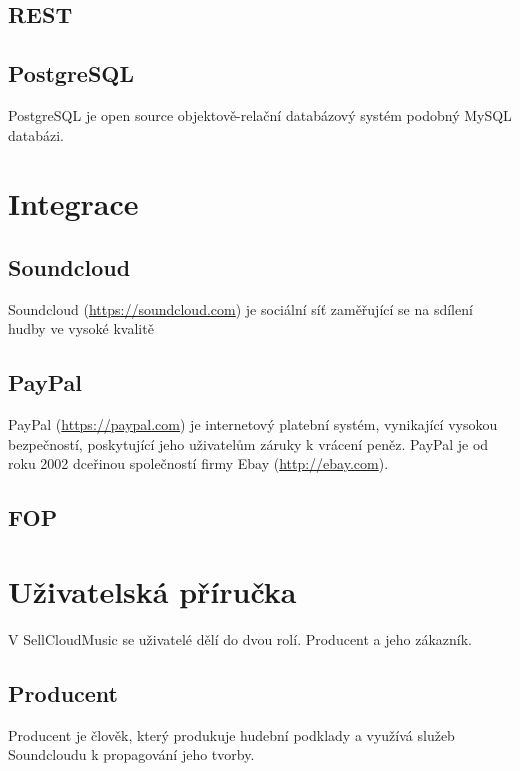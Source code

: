 \documentclass[12pt]{article}
\begin{document}
\subsection{REST}

\subsection{PostgreSQL}

PostgreSQL je open source objektově-relační databázový systém podobný MySQL databázi.


\section{Integrace}

\subsection{Soundcloud}

Soundcloud (\url{https://soundcloud.com}) je sociální síť zaměřující se na sdílení hudby ve vysoké kvalitě

\subsection{PayPal}

PayPal (\url{https://paypal.com}) je internetový platební systém, vynikající vysokou bezpečností, poskytující jeho uživatelům záruky k vrácení peněz.
PayPal je od roku 2002 dceřinou společností firmy Ebay (\url{http://ebay.com}).

\subsection{FOP}

\section{Uživatelská příručka}

V SellCloudMusic se uživatelé dělí do dvou rolí. Producent a jeho zákazník.

\subsection{Producent}

Producent je člověk, který produkuje hudební podklady a využívá služeb Soundcloudu k propagování jeho tvorby.
\end{document}

